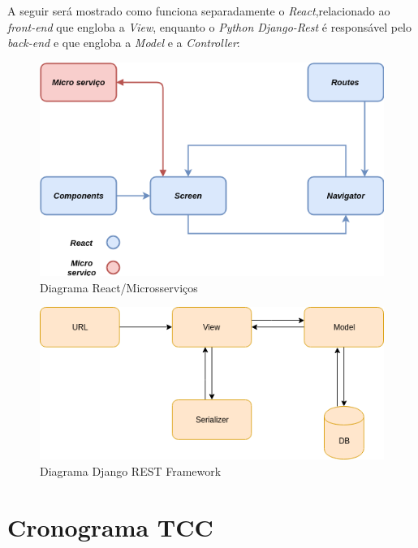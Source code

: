 

A seguir será mostrado como funciona separadamente o \textit{React},relacionado ao \textit{front-end} que engloba a \textit{View}, enquanto o \textit{Python Django-Rest} é responsável pelo \textit{back-end} e que engloba a \textit{Model} e a \textit{Controller}:

\begin{figure}[H]
	\centering
	\includegraphics[width=1.0\textwidth]{figuras/diagrama_react.png}
	\caption{Diagrama React/Microsserviços}
	\label{img:diagrama_react}
\end{figure}

\begin{figure}[H]
	\centering
	\includegraphics[width=1.0\textwidth]{figuras/django_rest.png}
	\caption{Diagrama Django REST Framework}
	\label{img:diagrama_rest}
\end{figure}

\section{Cronograma TCC}
